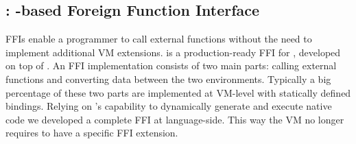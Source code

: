 \subsection{\NB: \B-based Foreign Function Interface}


FFIs enable a programmer to call external functions without the need to implement additional VM extensions.
\NB \cite{Brun13a} is a production-ready FFI for \PH, developed on top of \B.
An FFI implementation consists of two main parts: calling external functions and converting data between the two environments.
Typically a big percentage of these two parts are implemented at VM-level with statically defined bindings.
Relying on \B's capability to dynamically generate and execute native code we developed a complete FFI at language-side.
This way the VM no longer requires to have a specific FFI extension.

